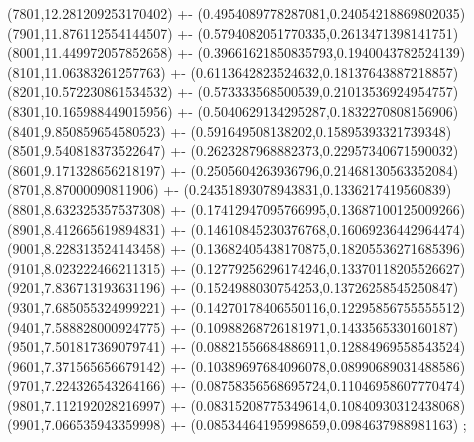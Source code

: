 {(7801,12.281209253170402) +- (0.4954089778287081,0.24054218869802035)
(7901,11.876112554144507) +- (0.5794082051770335,0.2613471398141751)
(8001,11.449972057852658) +- (0.39661621850835793,0.1940043782524139)
(8101,11.06383261257763) +- (0.6113642823524632,0.18137643887218857)
(8201,10.572230861534532) +- (0.573333568500539,0.21013536924954757)
(8301,10.165988449015956) +- (0.5040629134295287,0.1832270808156906)
(8401,9.850859654580523) +- (0.591649508138202,0.15895393321739348)
(8501,9.540818373522647) +- (0.2623287968882373,0.22957340671590032)
(8601,9.171328656218197) +- (0.2505604263936796,0.21468130563352084)
(8701,8.87000090811906) +- (0.24351893078943831,0.1336217419560839)
(8801,8.632325357537308) +- (0.17412947095766995,0.13687100125009266)
(8901,8.412665619894831) +- (0.14610845230376768,0.16069236442964474)
(9001,8.228313524143458) +- (0.13682405438170875,0.18205536271685396)
(9101,8.023222466211315) +- (0.12779256296174246,0.13370118205526627)
(9201,7.836713193631196) +- (0.1524988030754253,0.13726258545250847)
(9301,7.685055324999221) +- (0.14270178406550116,0.12295856755555512)
(9401,7.588828000924775) +- (0.10988268726181971,0.1433565330160187)
(9501,7.501817369079741) +- (0.08821556684886911,0.12884969558543524)
(9601,7.371565656679142) +- (0.10389697684096078,0.08990689031488586)
(9701,7.224326543264166) +- (0.08758356568695724,0.11046958607770474)
(9801,7.112192028216997) +- (0.08315208775349614,0.10840930312438068)
(9901,7.066535943359998) +- (0.08534464195998659,0.0984637988981163)
};
